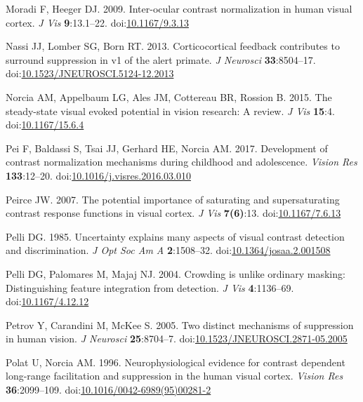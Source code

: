 \documentclass[]{article}
\begin{document}
\leavevmode\hypertarget{ref-Moradi2009}{}%
Moradi F, Heeger DJ. 2009. Inter-ocular contrast normalization in human visual cortex. \emph{J Vis} \textbf{9}:13.1--22. doi:\href{https://doi.org/10.1167/9.3.13}{10.1167/9.3.13}

\leavevmode\hypertarget{ref-Nassi2013}{}%
Nassi JJ, Lomber SG, Born RT. 2013. Corticocortical feedback contributes to surround suppression in v1 of the alert primate. \emph{J Neurosci} \textbf{33}:8504--17. doi:\href{https://doi.org/10.1523/JNEUROSCI.5124-12.2013}{10.1523/JNEUROSCI.5124-12.2013}

\leavevmode\hypertarget{ref-Norcia2015}{}%
Norcia AM, Appelbaum LG, Ales JM, Cottereau BR, Rossion B. 2015. The steady-state visual evoked potential in vision research: A review. \emph{J Vis} \textbf{15}:4. doi:\href{https://doi.org/10.1167/15.6.4}{10.1167/15.6.4}

\leavevmode\hypertarget{ref-Pei2017}{}%
Pei F, Baldassi S, Tsai JJ, Gerhard HE, Norcia AM. 2017. Development of contrast normalization mechanisms during childhood and adolescence. \emph{Vision Res} \textbf{133}:12--20. doi:\href{https://doi.org/10.1016/j.visres.2016.03.010}{10.1016/j.visres.2016.03.010}

\leavevmode\hypertarget{ref-Peirce2007}{}%
Peirce JW. 2007. The potential importance of saturating and supersaturating contrast response functions in visual cortex. \emph{J Vis} \textbf{7(6)}:13. doi:\href{https://doi.org/10.1167/7.6.13}{10.1167/7.6.13}

\leavevmode\hypertarget{ref-Pelli1985}{}%
Pelli DG. 1985. Uncertainty explains many aspects of visual contrast detection and discrimination. \emph{J Opt Soc Am A} \textbf{2}:1508--32. doi:\href{https://doi.org/10.1364/josaa.2.001508}{10.1364/josaa.2.001508}

\leavevmode\hypertarget{ref-Pelli2004}{}%
Pelli DG, Palomares M, Majaj NJ. 2004. Crowding is unlike ordinary masking: Distinguishing feature integration from detection. \emph{J Vis} \textbf{4}:1136--69. doi:\href{https://doi.org/10.1167/4.12.12}{10.1167/4.12.12}

\leavevmode\hypertarget{ref-Petrov2005}{}%
Petrov Y, Carandini M, McKee S. 2005. Two distinct mechanisms of suppression in human vision. \emph{J Neurosci} \textbf{25}:8704--7. doi:\href{https://doi.org/10.1523/JNEUROSCI.2871-05.2005}{10.1523/JNEUROSCI.2871-05.2005}

\leavevmode\hypertarget{ref-Polat1996}{}%
Polat U, Norcia AM. 1996. Neurophysiological evidence for contrast dependent long-range facilitation and suppression in the human visual cortex. \emph{Vision Res} \textbf{36}:2099--109. doi:\href{https://doi.org/10.1016/0042-6989(95)00281-2}{10.1016/0042-6989(95)00281-2}
\end{document}
